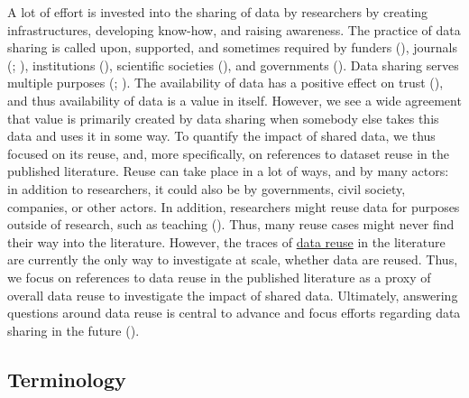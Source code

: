 \documentclass[
  letterpaper,
  DIV=11,
  numbers=noendperiod]{scrartcl}
\begin{document}
A lot of effort is invested into the sharing of data by researchers by
creating infrastructures, developing know-how, and raising awareness.
The practice of data sharing is called upon, supported, and sometimes
required by funders (),
journals (;
), institutions
(), scientific societies
(), and governments
(). Data sharing serves multiple purposes
(;
). The availability of data
has a positive effect on trust (), and thus availability of data is a value in itself. However, we
see a wide agreement that value is primarily created by data sharing
when somebody else takes this data and uses it in some way. To quantify
the impact of shared data, we thus focused on its reuse, and, more
specifically, on references to dataset reuse in the published
literature. Reuse can take place in a lot of ways, and by many actors:
in addition to researchers, it could also be by governments, civil
society, companies, or other actors. In addition, researchers might
reuse data for purposes outside of research, such as teaching
(). Thus, many reuse
cases might never find their way into the literature. However, the
traces of \hyperref[gls-data-reuse]{data reuse} in the literature are
currently the only way to investigate at scale, whether data are reused.
Thus, we focus on references to data reuse in the published literature
as a proxy of overall data reuse to investigate the impact of shared
data. Ultimately, answering questions around data reuse is central to
advance and focus efforts regarding data sharing in the future
().

\subsection{Terminology}\label{sec-intro-terminology}
\end{document}
